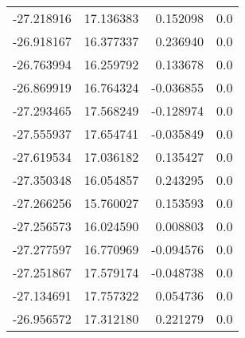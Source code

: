 \begin{tabular}{rrrr}
      -27.218916 &        17.136383 &    0.152098 &   0.0 \\
      -26.918167 &        16.377337 &    0.236940 &   0.0 \\
      -26.763994 &        16.259792 &    0.133678 &   0.0 \\
      -26.869919 &        16.764324 &   -0.036855 &   0.0 \\
      -27.293465 &        17.568249 &   -0.128974 &   0.0 \\
      -27.555937 &        17.654741 &   -0.035849 &   0.0 \\
      -27.619534 &        17.036182 &    0.135427 &   0.0 \\
      -27.350348 &        16.054857 &    0.243295 &   0.0 \\
      -27.266256 &        15.760027 &    0.153593 &   0.0 \\
      -27.256573 &        16.024590 &    0.008803 &   0.0 \\
      -27.277597 &        16.770969 &   -0.094576 &   0.0 \\
      -27.251867 &        17.579174 &   -0.048738 &   0.0 \\
      -27.134691 &        17.757322 &    0.054736 &   0.0 \\
      -26.956572 &        17.312180 &    0.221279 &   0.0 \\
\bottomrule
\end{tabular}
